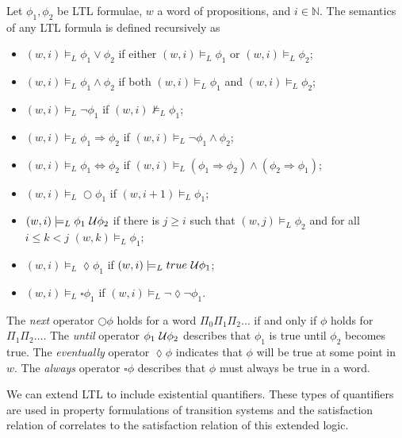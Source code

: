 \begin{defi}
Let $\phi_{1},\phi_{2}$ be LTL formulae, $w$ a word of propositions, and $i\in\mathbb{N}$. The semantics of any LTL formula is defined recursively as
\begin{itemize}
    \item{$(w,i)\models_{L}\phi_{1}\lor\phi_{2}$ if either $(w,i)\models_{L}\phi_{1}$ or $(w,i)\models_{L}\phi_{2}$;}
    \item{$(w,i)\models_{L}\phi_{1}\land\phi_{2}$ if both $(w,i)\models_{L}\phi_{1}$ and $(w,i)\models_{L}\phi_{2}$;}
    \item{$(w,i)\models_{L}\lnot\phi_{1}$ if $(w,i)\not\models_{L}\phi_{1}$;}
    \item{$(w,i)\models_{L}\phi_{1}\Rightarrow\phi_{2}$ if $(w,i)\models_{L}\lnot\phi_{1} \land \phi_{2}$;}
    \item{$(w,i)\models_{L}\phi_{1}\Leftrightarrow\phi_{2}$ if $(w,i)\models_{L}(\phi_{1}\Rightarrow\phi_{2})\land(\phi_{2}\Rightarrow\phi_{1})$;}
    \item{$(w,i)\models_{L}\bigcirc\phi_{1}$ if $(w,i+1)\models_{L}\phi_{1}$;}
    \item{$(w,i)\models_{L}\phi_{1}\ \mathcal{U}\phi_{2}$ if there is $j\geq i$ such that $(w,j)\models_{L}\phi_{2}$ and for all $i\leq k < j$ $(w,k)\models_{L}\phi_{1}$;}
    \item{$(w,i)\models_{L}\lozenge\phi_{1}$ if $(w,i)\models_{L}true\ \mathcal{U}\phi_{1}$;}
    \item{$(w,i)\models_{L}\square\phi_{1}$ if $(w,i)\models_{L}\lnot\lozenge\lnot\phi_{1}$.}
\end{itemize}
\end{defi}

The \emph{next} operator $\bigcirc\phi$ holds for a word $\Pi_{0}\Pi_{1}\Pi_{2}\ldots$ if and only if $\phi$ holds for $\Pi_{1}\Pi_{2}\ldots$. The \emph{until} operator $\phi_{1}\ \mathcal{U}\phi_{2}$ describes that $\phi_{1}$ is true until $\phi_{2}$ becomes true. The \emph{eventually} operator $\lozenge\phi$ indicates that $\phi$ will be true at some point in $w$. The \emph{always} operator $\square\phi$ describes that $\phi$ must always be true in a word.

We can extend LTL to include existential quantifiers. These types of quantifiers are used in property formulations of transition systems and the satisfaction relation of correlates to the satisfaction relation of this extended logic.

